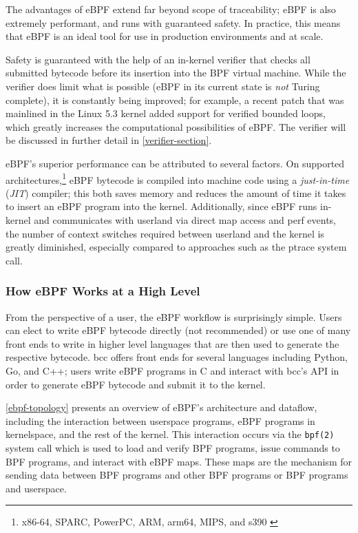 \documentclass[
  12pt]{findlay}
\begin{document}
The advantages of eBPF extend far beyond scope of traceability; eBPF is
also extremely performant, and runs with guaranteed safety. In practice,
this means that eBPF is an ideal tool for use in production environments
and at scale.

Safety is guaranteed with the help of an in-kernel verifier that checks
all submitted bytecode before its insertion into the BPF virtual
machine. While the verifier does limit what is possible (eBPF in its
current state is \emph{not} Turing complete), it is constantly being
improved; for example, a recent patch \autocite{starovoitov19} that was
mainlined in the Linux 5.3 kernel added support for verified bounded
loops, which greatly increases the computational possibilities of eBPF.
The verifier will be discussed in further detail in
\autoref{verifier-section}.

eBPF's superior performance can be attributed to several factors. On
supported
architectures,\footnote{x86-64, SPARC, PowerPC, ARM, arm64, MIPS, and s390 \cite{fleming17}}
eBPF bytecode is compiled into machine code using a \emph{just-in-time}
(\emph{JIT}) compiler; this both saves memory and reduces the amount of
time it takes to insert an eBPF program into the kernel. Additionally,
since eBPF runs in-kernel and communicates with userland via direct map
access and perf events, the number of context switches required between
userland and the kernel is greatly diminished, especially compared to
approaches such as the ptrace system call.

\hypertarget{how-ebpf-works-at-a-high-level}{%
\subsubsection{How eBPF Works at a High
Level}\label{how-ebpf-works-at-a-high-level}}

From the perspective of a user, the eBPF workflow is surprisingly
simple. Users can elect to write eBPF bytecode directly (not
recommended) or use one of many front ends to write in higher level
languages that are then used to generate the respective bytecode. bcc
\autocite{bcc} offers front ends for several languages including Python,
Go, and C++; users write eBPF programs in C and interact with bcc's API
in order to generate eBPF bytecode and submit it to the kernel.

\autoref{ebpf-topology} presents an overview of eBPF's architecture and
dataflow, including the interaction between userspace programs, eBPF
programs in kernelspace, and the rest of the kernel. This interaction
occurs via the \passthrough{\lstinline!bpf(2)!} system call
\autocite{man-bpf} which is used to load and verify BPF programs, issue
commands to BPF programs, and interact with eBPF maps. These maps are
the mechanism for sending data between BPF programs and other BPF
programs or BPF programs and userspace.
\end{document}
